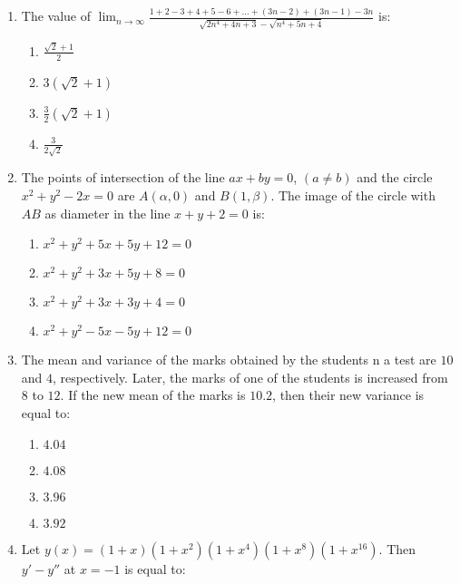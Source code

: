 \documentclass[journal,12pt,onecolumn]{IEEEtran}
\theoremstyle{remark}
\begin{document}
\begin{enumerate}
\item The value of $\lim_{n \to \infty} \frac{1 + 2 - 3 + 4 + 5 - 6 + \dots + (3n - 2) + (3n - 1) - 3n}{\sqrt{2n^4 + 4n + 3} - \sqrt{n^4 + 5n + 4}}$ is:
    \begin{enumerate}
        \item $\frac{\sqrt{2} + 1}{2}$
        \item $3(\sqrt{2} + 1)$
        \item $\frac{3}{2} (\sqrt{2} + 1)$
        \item $\frac{3}{2\sqrt{2}}$
    \end{enumerate}

\item The points of intersection of the line $ax + by = 0$, $(a \neq b)$ and the circle $x^2 + y^2 - 2x = 0$ are $A(\alpha, 0)$ and $B(1, \beta)$. The image of the circle with $AB$ as diameter in the line $x + y + 2 = 0$ is:
    \begin{enumerate}
        \item $x^2 + y^2 + 5x + 5y + 12 = 0$
        \item $x^2 + y^2 + 3x + 5y + 8 = 0$
        \item $x^2 + y^2 + 3x + 3y + 4 = 0$
        \item $x^2 + y^2 - 5x - 5y + 12 = 0$
    \end{enumerate}

 \item The mean and variance of the marks obtained by the students n a test are $10$and $4$, respectively. Later, the marks of one of the students is increased from $8$ to $12$. If the new mean of the marks is $10.2$, then their new variance is equal to:
    \begin{enumerate}
        \item $4.04$
        \item $4.08$
        \item $3.96$
        \item $3.92$
    \end{enumerate}

\item Let $y(x) = (1+x)(1+x^2)(1+x^4)(1+x^8)(1+x^{16})$. 
Then $y' - y''$ at $x = -1$ is equal to:


\end{enumerate}
\end{document}
